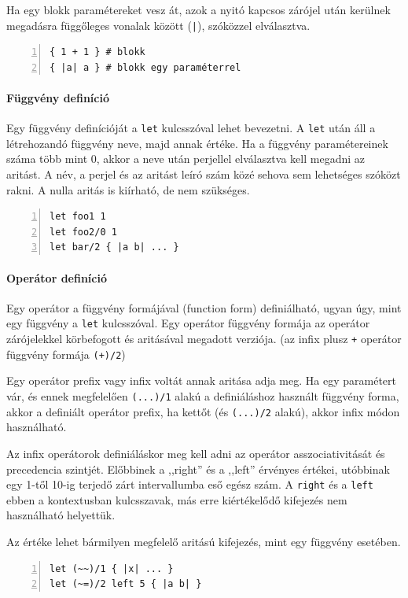 Ha egy blokk paramétereket vesz át, azok a nyitó kapcsos zárójel után kerülnek megadásra függőleges vonalak között ({\tt |}), szóközzel elválasztva.

\begin{lstlisting}[numbers=left]
{ 1 + 1 } # blokk
{ |a| a } # blokk egy paraméterrel
\end{lstlisting}

\paragraph{Függvény definíció} Egy függvény definícióját a {\tt let} kulcsszóval lehet bevezetni. A {\tt let} után áll a létrehozandó függvény neve, majd annak értéke.
Ha a függvény paramétereinek száma több mint 0, akkor a neve után perjellel elválasztva kell megadni az aritást.
A név, a perjel és az aritást leíró szám közé sehova sem lehetséges szóközt rakni.
A nulla aritás is kiírható, de nem szükséges.

\begin{lstlisting}[numbers=left]
let foo1 1
let foo2/0 1
let bar/2 { |a b| ... }
\end{lstlisting}

\paragraph{Operátor definíció} Egy operátor a függvény formájával (function form) definiálható, ugyan úgy, mint egy függvény a {\tt let} kulcsszóval.
Egy operátor függvény formája az operátor zárójelekkel körbefogott és aritásával megadott verziója. (\pl az infix plusz {\tt +} operátor függvény formája {\tt (+)/2})

Egy operátor prefix vagy infix voltát annak aritása adja meg.
Ha egy paramétert vár, és ennek megfelelően {\tt (...)/1} alakú a definiáláshoz használt függvény forma, akkor a definiált operátor prefix, ha kettőt (és {\tt (...)/2} alakú), akkor infix módon használható.

Az infix operátorok definiáláskor meg kell adni az operátor asszociativitását és precedencia szintjét.
Előbbinek a ,,right'' és a ,,left'' érvényes értékei, utóbbinak egy 1-től 10-ig terjedő zárt intervallumba eső egész szám.
A {\tt right} és a {\tt left} ebben a kontextusban kulcsszavak, más erre kiértékelődő kifejezés nem használható helyettük.

Az értéke lehet bármilyen megfelelő aritású kifejezés, mint egy függvény esetében.

\begin{lstlisting}[numbers=left]
let (~~)/1 { |x| ... }
let (~=)/2 left 5 { |a b| }
\end{lstlisting}


